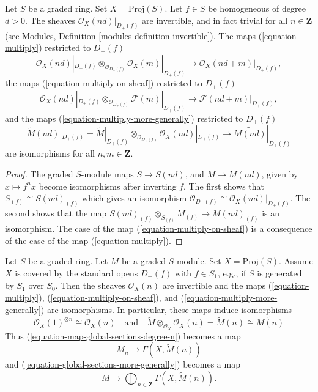 \begin{lemma}
\label{lemma-when-invertible}
Let $S$ be a graded ring. Set $X = \text{Proj}(S)$.
Let $f \in S$ be homogeneous of degree $d > 0$.
The sheaves $\mathcal{O}_X(nd)|_{D_{+}(f)}$ are invertible,
and in fact trivial for all $n \in \mathbf{Z}$
(see Modules, Definition \ref{modules-definition-invertible}).
The maps (\ref{equation-multiply}) restricted to $D_{+}(f)$
$$
\mathcal{O}_X(nd)|_{D_{+}(f)} \otimes_{\mathcal{O}_{D_{+}(f)}}
\mathcal{O}_X(m)|_{D_{+}(f)}
\longrightarrow
\mathcal{O}_X(nd + m)|_{D_{+}(f)},
$$
the maps (\ref{equation-multiply-on-sheaf}) restricted to $D_+(f)$
$$
\mathcal{O}_X(nd)|_{D_{+}(f)} \otimes_{\mathcal{O}_{D_{+}(f)}}
\mathcal{F}(m)|_{D_{+}(f)}
\longrightarrow
\mathcal{F}(nd + m)|_{D_{+}(f)},
$$
and the maps (\ref{equation-multiply-more-generally})
restricted to $D_{+}(f)$
$$
\widetilde M(nd)|_{D_{+}(f)}
=
\widetilde M|_{D_{+}(f)}
\otimes_{\mathcal{O}_{D_{+}(f)}}
\mathcal{O}_X(nd)|_{D_{+}(f)}
\longrightarrow
\widetilde{M(nd)}|_{D_{+}(f)}
$$
are isomorphisms for all $n, m \in \mathbf{Z}$.
\end{lemma}

\begin{proof}
The graded $S$-module maps $S \to S(nd)$, and $M \to M(nd)$, given by
$x \mapsto f^n x$ become isomorphisms after inverting $f$. The first shows that
$S_{(f)} \cong S(nd)_{(f)}$ which gives an isomorphism
$\mathcal{O}_{D_{+}(f)} \cong \mathcal{O}_X(nd)|_{D_{+}(f)}$.
The second shows that the map
$S(nd)_{(f)} \otimes_{S_{(f)}} M_{(f)} \to M(nd)_{(f)}$
is an isomorphism. The case of the map (\ref{equation-multiply-on-sheaf})
is a consequence of the case of the map (\ref{equation-multiply}).
\end{proof}

\begin{lemma}
\label{lemma-apply-modules}
Let $S$ be a graded ring. Let $M$ be a graded $S$-module.
Set $X = \text{Proj}(S)$. Assume $X$ is covered by the standard
opens $D_+(f)$ with $f \in S_1$, e.g., if $S$ is generated by $S_1$
over $S_0$. Then the sheaves $\mathcal{O}_X(n)$
are invertible and the maps
(\ref{equation-multiply}), (\ref{equation-multiply-on-sheaf}), and
(\ref{equation-multiply-more-generally}) are isomorphisms.
In particular, these maps induce isomorphisms
$$
\mathcal{O}_X(1)^{\otimes n} \cong
\mathcal{O}_X(n)
\quad
\text{and}
\quad
\widetilde{M} \otimes_{\mathcal{O}_X} \mathcal{O}_X(n) =
\widetilde{M}(n) \cong \widetilde{M(n)}
$$
Thus (\ref{equation-map-global-sections-degree-n}) becomes a map
\begin{equation}
\label{equation-map-global-sections-degree-n-simplified}
M_n \longrightarrow \Gamma(X, \widetilde{M}(n))
\end{equation}
and (\ref{equation-global-sections-more-generally}) becomes a map
\begin{equation}
\label{equation-global-sections-more-generally-simplified}
M \longrightarrow
\bigoplus\nolimits_{n \in \mathbf{Z}} \Gamma(X, \widetilde{M}(n)).
\end{equation}
\end{lemma}

